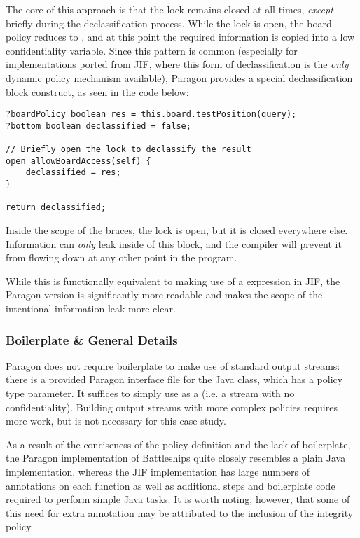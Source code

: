 The core of this approach is that the lock remains closed at all times, \textit{except} briefly during the declassification process. While the lock is open, the board policy reduces to , and at this point the required information is copied into a low confidentiality variable. Since this pattern is common (especially for implementations ported from JIF, where this form of declassification is the \textit{only} dynamic policy mechanism available), Paragon provides a special declassification block construct, as seen in the code below:

\begin{verbatim}
?boardPolicy boolean res = this.board.testPosition(query);
?bottom boolean declassified = false;

// Briefly open the lock to declassify the result
open allowBoardAccess(self) {
	declassified = res;
}

return declassified;
\end{verbatim}

Inside the scope of the braces, the lock is open, but it is closed everywhere else. Information can \textit{only} leak inside of this block, and the compiler will prevent it from flowing down at any other point in the program.

While this is functionally equivalent to making use of a  expression in JIF, the Paragon version is significantly more readable and makes the scope of the intentional information leak more clear.

\subsubsection{Boilerplate \& General Details}

Paragon does not require boilerplate to make use of standard output streams: there is a provided Paragon interface file for the Java  class, which has a policy type parameter. It suffices to simply use  as a  (i.e. a stream with no confidentiality). Building output streams with more complex policies requires more work, but is not necessary for this case study.

As a result of the conciseness of the policy definition and the lack of boilerplate, the Paragon implementation of Battleships quite closely resembles a plain Java implementation, whereas the JIF implementation has large numbers of annotations on each function as well as additional steps and boilerplate code required to perform simple Java tasks. It is worth noting, however, that some of this need for extra annotation may be attributed to the inclusion of the integrity policy.

